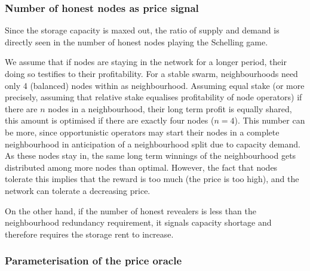 



\subsubsection{Number of honest nodes as price signal}

Since the storage capacity is maxed out, the ratio of supply and demand is directly seen in the number of honest nodes playing the Schelling game. 

We assume that if nodes are staying in the network for a longer period, their doing so testifies to their profitability. For a stable swarm, neighbourhoods need only 4 (balanced) nodes within as neighbourhood. Assuming equal stake (or more precisely, assuming that relative stake equalises profitability of node operators) if there are $n$ nodes in a neighbourhood, their long term profit is equally shared, this amount is optimised if there are exactly four nodes ($n=4$). This number can be more, since opportunistic operators may start their nodes in a complete neighbourhood in anticipation of a neighbourhood split due to capacity demand. As these nodes stay in, the same long term winnings of the neighbourhood gets distributed among more nodes than optimal.
However, the fact that nodes tolerate this implies that the reward is too much (the price is too high), and the network can tolerate a decreasing price.

On the other hand, if the number of honest revealers is less than the neighbourhood redundancy requirement, it signals capacity shortage and therefore requires the storage rent to increase. 




\subsubsection{Parameterisation of the price oracle}


